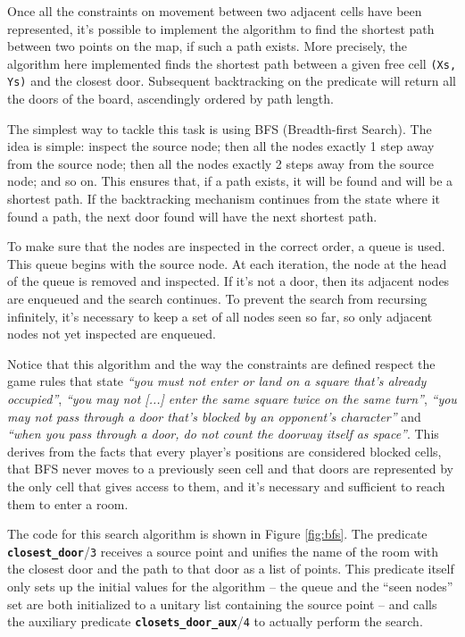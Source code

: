 \documentclass[12pt,a4paper]{article}
\newcommand{\varname}[1]{\texttt{#1}}
\newcommand{\varnamebf}[1]{\textbf{\texttt{#1}}}
\newcommand{\predprot}[2]{{\color{MidnightBlue}\varnamebf{#1}}/{\color{Mulberry}\varname{#2}}}
\begin{document}
Once all the constraints on movement between two adjacent cells have been represented, it's possible to implement the algorithm to find the shortest path between two points on the map, if such a path exists. More precisely, the algorithm here implemented finds the shortest path between a given free cell \varname{(Xs, Ys)} and the closest door. Subsequent backtracking on the predicate will return all the doors of the board, ascendingly ordered by path length.

The simplest way to tackle this task is using BFS (Breadth-first Search). The idea is simple: inspect the source node; then all the nodes exactly 1 step away from the source node; then all the nodes exactly 2 steps away from the source node; and so on. This ensures that, if a path exists, it will be found and will be a shortest path. If the backtracking mechanism continues from the state where it found a path, the next door found will have the next shortest path.

To make sure that the nodes are inspected in the correct order, a queue is used. This queue begins with the source node. At each iteration, the node at the head of the queue is removed and inspected. If it's not a door, then its adjacent nodes are enqueued and the search continues. To prevent the search from recursing infinitely, it's necessary to keep a set of all nodes seen so far, so only adjacent nodes not yet inspected are enqueued.

Notice that this algorithm and the way the constraints are defined respect the game rules that state \textit{``you must not enter or land on a square that's already occupied''}, \textit{``you may not [...] enter the same square twice on the same turn''}, \textit{``you may not pass through a door that's blocked by an opponent's character''} and \textit{``when you pass through a door, do not count the doorway itself as space''}. This derives from the facts that every player's positions are considered blocked cells, that BFS never moves to a previously seen cell and that doors are represented by the only cell that gives access to them, and it's necessary and sufficient to reach them to enter a room.

The code for this search algorithm is shown in Figure \ref{fig:bfs}. The predicate \predprot{closest\_door}{3} receives a source point and unifies the name of the room with the closest door and the path to that door as a list of points. This predicate itself only sets up the initial values for the algorithm -- the queue and the ``seen nodes'' set are both initialized to a unitary list containing the source point -- and calls the auxiliary predicate \predprot{closets\_door\_aux}{4} to actually perform the search.
\end{document}
